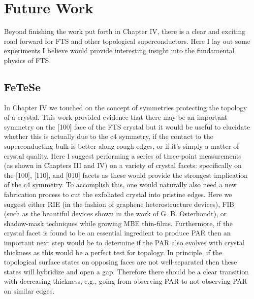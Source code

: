 \section{Future Work}
Beyond finishing the work put forth in Chapter IV, there is a clear and exciting road forward for \ac{FTS} and other topological superconductors. Here I lay out some experiments I believe would provide interesting insight into the fundamental physics of \ac{FTS}.
\subsection{FeTeSe}
In Chapter IV we touched on the concept of symmetries protecting the topology of a crystal. This work provided evidence that there may be an important symmetry on the [100] face of the \ac{FTS} crystal but it would be useful to elucidate whether this is actually due to the c4 symmetry, if the contact to the superconducting bulk is better along rough edges, or if it's simply a matter of crystal quality. Here I suggest performing a series of three-point measurements (as shown in Chapters III and IV) on a variety of crystal facets: specifically on the [100], [110], and [010] facets as these would provide the strongest implication of the c4 symmetry. To accomplish this, one would naturally also need a new fabrication process to cut the exfoliated crystal into pristine edges. Here we suggest either RIE (in the fashion of graphene heterostructure devices), FIB (such as the beautiful devices shown in the work of G. B. Osterhoudt\cite{Osterhoudt2019}), or shadow-mask techniques while growing MBE thin-films. Furthermore, if the crystal facet is found to be an essential ingredient to produce \ac{PAR} then an important next step would be to determine if the \ac{PAR} also evolves with crystal thickness as this would be a perfect test for topology. In principle, if the topological surface states on opposing faces are not well-separated then these states will hybridize and open a gap. Therefore there should be a clear transition with decreasing thickness, e.g., going from observing \ac{PAR} to not observing \ac{PAR} on similar edges.\par
